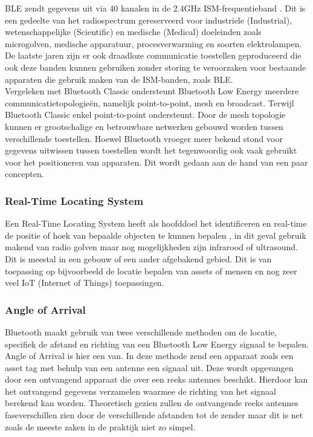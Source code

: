 BLE zendt gegevens uit via 40 kanalen in de 2.4GHz ISM-frequentieband \autocite{Kumbhar_2017}. Dit is een gedeelte van het radiospectrum gereserveerd voor industriele (Industrial), wetenschappelijke (Scientific) en medische (Medical) doeleinden zoals microgolven, medische apparatuur, procesverwarming en soorten elektrolampen. De laatste jaren zijn er ook draadloze communicatie toestellen geproduceerd die ook deze banden kunnen gebruiken zonder storing te veroorzaken voor bestaande apparaten die gebruik maken van de ISM-banden, zoals BLE.\\

Vergeleken met Bluetooth Classic ondersteunt Bluetooth Low Energy meerdere communicatietopologieën, namelijk point-to-point, mesh en broadcast. Terwijl Bluetooth Classic enkel point-to-point ondersteunt. Door de mesh topologie kunnen er grootschalige en betrouwbare netwerken gebouwd worden tussen verschillende toestellen. Hoewel Bluetooth vroeger meer bekend stond voor gegevens uitwissen tussen toestellen wordt het tegenwoordig ook vaak gebruikt voor het positioneren van apparaten. Dit wordt gedaan aan de hand van een paar concepten.

\subsubsection{Real-Time Locating System}

Een Real-Time Locating System heeft als hoofddoel het identificeren en real-time de positie of hoek van bepaalde objecten te kunnen bepalen \autocite{Lehtimaki2018}, in dit geval gebruik makend van radio golven maar nog mogelijkheden zijn infrarood of ultrasound. Dit is meestal in een gebouw of een ander afgebakend gebied. Dit is van toepassing op bijvoorbeeld de locatie bepalen van assets of mensen en nog zeer veel IoT (Internet of Things) toepassingen.

\subsubsection{Angle of Arrival}

Bluetooth maakt gebruik van twee verschillende methoden om de locatie, specifiek de afstand en richting van een Bluetooth Low Energy signaal te bepalen. Angle of Arrival is hier een van. 
In deze methode zend een apparaat zoals een asset tag met behulp van een antenne een signaal uit. Deze wordt opgevangen door een ontvangend apparaat die over een reeks antennes beschikt. Hierdoor kan het ontvangend gegevens verzamelen waarmee de richting van het signaal berekend kan worden. Theoretisch gezien zullen de ontvangende reeks antennes faseverschillen zien door de verschillende afstanden tot de zender maar dit is net zoals de meeste zaken in de praktijk niet zo simpel.
